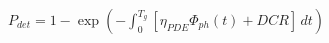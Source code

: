 \documentclass[preview, border=8pt, 12pt]{standalone}
\begin{document}
$\displaystyle 
P_{det} = 1 - \exp\left(-\int_{0}^{T_g}\! [\eta_{PDE} \Phi_{ph}(t) + DCR]\,dt\right)
$
\end{document}
